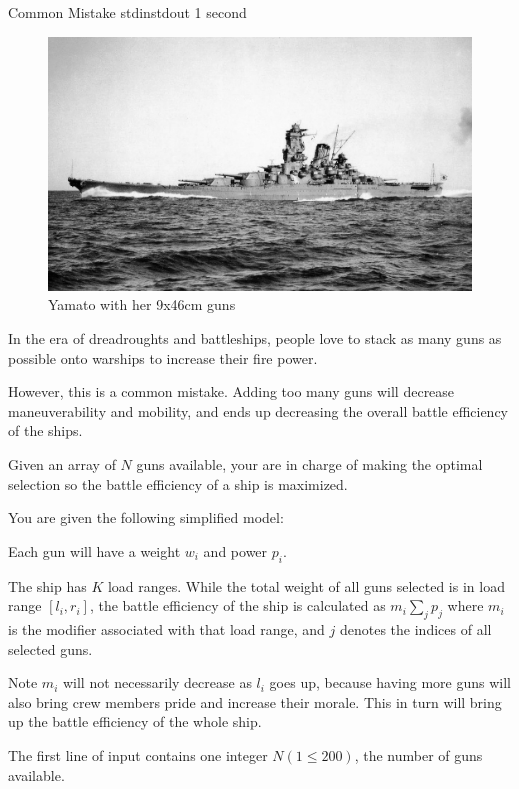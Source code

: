\begin{problem}{Common Mistake}
{stdin}{stdout}
{1 second}{}{}

\begin{figure}
    \includegraphics[scale=0.3]{yamato.jpg}
    \caption*{Yamato with her 9x46cm guns}
\end{figure}

In the era of dreadroughts and battleships, people love to stack as many guns as
possible onto warships to increase their fire power.

However, this is a common mistake. Adding too many guns will decrease
maneuverability and mobility, and ends up decreasing the overall battle
efficiency of the ships. 

Given an array of $N$ guns available, your are in charge of making the optimal
selection so the battle efficiency of a ship is maximized.

You are given the following simplified model:

Each gun will have a weight $w_i$ and power $p_i$.

The ship has $K$ load ranges. While the total weight of all guns selected is in
load range $[l_i, r_i]$, the battle efficiency of the ship is calculated as
$m_i\sum_j p_j$ where $m_i$ is the modifier associated with that load range, and
$j$ denotes the indices of all selected guns.

Note $m_i$ will not necessarily decrease as $l_i$ goes up,
because having more guns will also bring crew members pride and increase their 
morale. This in turn will bring up the battle efficiency of the whole ship.

\InputFile

The first line of input contains one integer $N (1 \le 200)$, the number 
of guns available.


\end{problem}
